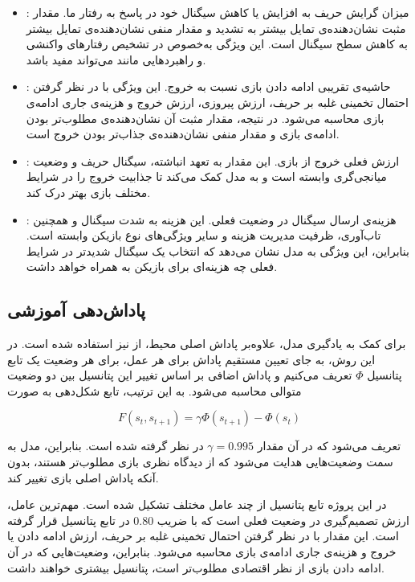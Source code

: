 \documentclass[12pt]{article}
\begin{document}
\begin{itemize}
    \item {}:
    میزان گرایش حریف به افزایش یا کاهش سیگنال خود در پاسخ به رفتار ما.
    مقدار مثبت نشان‌دهنده‌ی تمایل بیشتر به تشدید و مقدار منفی نشان‌دهنده‌ی
    تمایل بیشتر به کاهش سطح سیگنال است.
    این ویژگی به‌خصوص در تشخیص رفتارهای واکنشی و راهبردهایی مانند
     می‌تواند مفید باشد.

    \item {}:
    حاشیه‌ی تقریبی ادامه دادن بازی نسبت به خروج.
    این ویژگی با در نظر گرفتن احتمال تخمینی غلبه بر حریف، ارزش پیروزی،
    ارزش خروج و هزینه‌ی جاری ادامه‌ی بازی محاسبه می‌شود.
    در نتیجه، مقدار مثبت آن نشان‌دهنده‌ی مطلوب‌تر بودن ادامه‌ی بازی
    و مقدار منفی نشان‌دهنده‌ی جذاب‌تر بودن خروج است.

    \item {}:
    ارزش فعلی خروج از بازی.
    این مقدار به تعهد انباشته، سیگنال حریف و وضعیت میانجی‌گری وابسته است
    و به مدل کمک می‌کند تا جذابیت خروج را در شرایط مختلف بازی بهتر درک کند.

    \item {}:
    هزینه‌ی ارسال سیگنال در وضعیت فعلی.
    این هزینه به شدت سیگنال و همچنین تاب‌آوری، ظرفیت مدیریت هزینه و
    سایر ویژگی‌های نوع بازیکن وابسته است.
    بنابراین، این ویژگی به مدل نشان می‌دهد که انتخاب یک سیگنال شدیدتر
    در شرایط فعلی چه هزینه‌ای برای بازیکن به همراه خواهد داشت.

\end{itemize}

\subsection{پاداش‌دهی آموزشی}

برای کمک به یادگیری مدل، علاوه‌بر پاداش اصلی محیط، از
نیز استفاده شده است. در این روش، به جای تعیین مستقیم پاداش برای
هر عمل، برای هر وضعیت یک تابع پتانسیل $\Phi$ تعریف می‌کنیم و
پاداش اضافی بر اساس تغییر این پتانسیل بین دو وضعیت متوالی محاسبه
می‌شود. به این ترتیب، تابع شکل‌دهی به صورت

\[
F(s_t,s_{t+1})
=
\gamma \Phi(s_{t+1})-\Phi(s_t)
\]

تعریف می‌شود که در آن مقدار $\gamma=0.995$ در نظر گرفته شده است.
بنابراین، مدل به سمت وضعیت‌هایی هدایت می‌شود که از دیدگاه نظری
بازی مطلوب‌تر هستند، بدون آنکه پاداش اصلی بازی تغییر کند.

در این پروژه تابع پتانسیل از چند عامل مختلف تشکیل شده است. مهم‌ترین
عامل، ارزش تصمیم‌گیری در وضعیت فعلی است که با ضریب $0.80$ در تابع
پتانسیل قرار گرفته است. این مقدار با در نظر گرفتن احتمال تخمینی
غلبه بر حریف، ارزش ادامه دادن یا خروج و هزینه‌ی جاری ادامه‌ی بازی
محاسبه می‌شود. بنابراین، وضعیت‌هایی که در آن ادامه دادن بازی از
نظر اقتصادی مطلوب‌تر است، پتانسیل بیشتری خواهند داشت.
\end{document}

